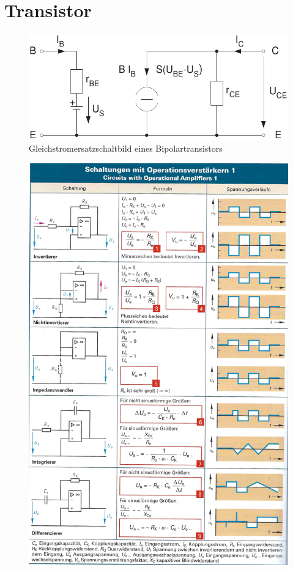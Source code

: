 \documentclass[a5paper, 12pt]{scrartcl}
\begin{document}
\section{Transistor}

\begin{figure}[H]
  \centering
  \includegraphics[width=.6\textwidth]{ESBTransistor}
  \caption{Gleichstromersatzschaltbild eines Bipolartransistors}
\end{figure}

\clearpage
\begin{figure}[H]
  \centering
  \includegraphics[width=.9\textwidth]{OPV1}
\end{figure}
\end{document}
